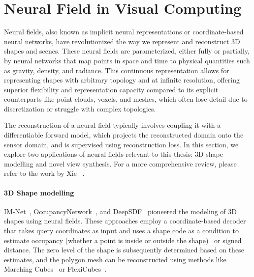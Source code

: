 \section{Neural Field in Visual Computing}
\label{sec:bg_neural_field}
Neural fields, also known as implicit neural representations or coordinate-based neural networks, have revolutionized the way we represent and reconstruct 3D shapes and scenes. These neural fields are parameterized, either fully or partially, by neural networks that map points in space and time to physical quantities such as gravity, density, and radiance. This continuous representation allows for representing shapes with arbitrary topology and at infinite resolution, offering superior flexibility and representation capacity compared to its explicit counterparts like point clouds, voxels, and meshes, which often lose detail due to discretization or struggle with complex topologies.

The reconstruction of a neural field typically involves coupling it with a differentiable forward model, which projects the reconstructed domain onto the sensor domain, and is supervised using reconstruction loss. In this section, we explore two applications of neural fields relevant to this thesis: 3D shape modelling and novel view synthesis. For a more comprehensive review, please refer to the work by Xie \etal~\cite{xie2022neural}.

\paragraph{3D Shape modelling}
IM-Net~\cite{chen2019learning}, OccupancyNetwork~\cite{mescheder2019occupancy}, and DeepSDF~\cite{park2019deepsdf} pioneered the modeling of 3D shapes using neural fields. These approaches employ a coordinate-based decoder that takes query coordinates as input and uses a shape code as a condition to estimate occupancy (whether a point is inside or outside the shape)~\cite{mescheder2019occupancy, chen2019learning} or signed distance\cite{park2019deepsdf}. The zero level of the shape is subsequently determined based on these estimates, and the polygon mesh can be reconstructed using methods like Marching Cubes~\cite{levoy1990efficient} or FlexiCubes~\cite{shen2023flexible}.

